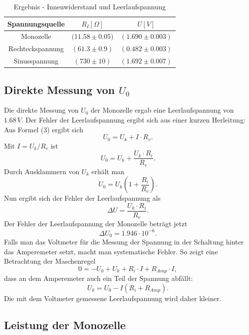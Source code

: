 \documentclass[11pt,ngerman,a4paper]{article}
\begin{document}
 \begin{table}[h]
 \centering
 \begin{tabular}{|c|c|c|}
  \hline
  Spannungsquelle & $R_I[\Omega]$ & $U[V]$ \\
  \hline
  Monozelle & $(11.58\pm$0.05) & $(1.690\pm0.003)$ \\
  Rechteckspannung & $(61.3\pm0.9)$& $(0.482\pm0.003)$ \\
  Sinusspannung & $(730\pm10)$ & $(1.692\pm0.007)$\\
  \hline
 \end{tabular}
 \caption{Ergebnis - Innenwiderstand und Leerlaufspannung}
 \label{Ergebnis}
 \end{table}

\subsection{Direkte Messung von $U_0$}
Die direkte Messung von $U_0$ der Monozelle ergab eine Leerlaufspannung von $1.68\, V$. Der Fehler der Leerlaufspannung ergibt sich aus einer kurzen Herleitung:\newline
Aus Formel (3) ergibt sich
\[ U_0 = U_k + I \cdot R_v. \]
Mit $I=U_k / R_v$ ist
\[ U_0 = U_k + \frac{U_k \cdot R_i}{R_v}.\]
Durch Ausklammern von $U_k$ erhält man
\[ U_0 = U_k \left( 1+\frac{R_i}{R_v}\right) .\]
Nun ergibt sich der Fehler der Leerlaufspannung als
\[ \Delta U = \frac{U_k \cdot R_i}{R_v}. \]
Der Fehler der Leerlaufspannung der Monozelle beträgt jetzt
\[ \Delta U_0 = 1.946 \cdot 10^{-6}.\]
\newline
Falls man das Voltmeter für die Messung der Spannung in der Schaltung hinter das Amperemeter setzt, macht man systematische Fehler. So zeigt eine Betrachtung der Maschenregel
\[ 0 = -U_0 + U_k + R_i \cdot I + R_{Amp} \cdot I ,\]
dass an dem Amperemeter auch ein Teil der Spannung abfällt:
\[ U_k = U_0 - I(R_i + R_{Amp}). \]
\newline
Die mit dem Voltmeter gemessene Leerlaufspannung wird daher kleiner.
\subsection{Leistung der Monozelle}
\end{document}
